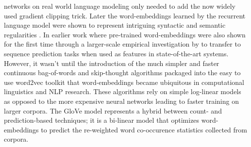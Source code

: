 networks on real world language modeling \cite{mikolov2012statistical} only needed to add the now
widely used gradient clipping trick. Later the word-embeddings learned by the recurrent language model were
shown to represent intriguing syntactic and semantic regularities \cite{mikolov2013linguistic} .
In earlier work where pre-trained word-embeddings were also shown for the first time through a
larger-scale empirical investigation by \cite{turian2010word} to transfer to sequence prediction tasks
when used as features in state-of-the-art systems.
However, it wasn't until the introduction of the much simpler and faster continuous bag-of-words and skip-thought
algorithms \cite{mikolov2013efficient} packaged into the easy to use word2vec toolkit that
word-embeddings became ubiquitous in computational linguistics and NLP research.
These algorithms rely on simple log-linear models as opposed to the more expensive
neural networks leading to faster training on larger corpora. The GloVe \cite{pennington2014glove}
model represents a hybrid between count- and prediction-based techniques;
it is a bi-linear model that optimizes word-embeddings to predict the re-weighted
word co-occurence statistics collected from corpora.

